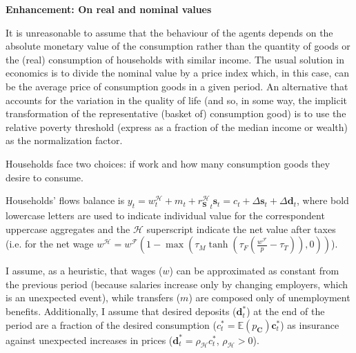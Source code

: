 \documentclass[a4paper, headings=standardclasses]{scrartcl}
\newenvironment{enh}[1][]{\begin{framed}\noindent\textbf{Enhancement: #1}\par}{\end{framed}}
\begin{document}
\begin{enh}[On real and nominal values]
    It is unreasonable to assume that the behaviour of the agents depends on the absolute monetary value of the consumption rather than the quantity of goods or the (real) consumption of households with similar income.
    The usual solution in economics is to divide the nominal value by a price index which, in this case, can be the average price of consumption goods in a given period.
    An alternative that accounts for the variation in the quality of life (and so, in some way, the implicit transformation of the representative (basket of) consumption good) is to use the relative poverty threshold (express as a fraction of the median income or wealth) as the normalization factor.
\end{enh}

Households face two choices: if work and how many consumption goods they desire to consume.

Households' flows balance is $y_t = w^{\mathcal{H}}_t + m_t + {r^{\mathcal{H}}_{\mathbf{S}}}_t \mathbf{s}_t = c_t + {\Delta \mathbf{s}}_t + {\Delta \mathbf{d}}_t$, where bold lowercase letters are used to indicate individual value for the correspondent uppercase aggregates and the $\mathcal{H}$ superscript indicate the net value after taxes (i.e. for the net wage $w^\mathcal{H} = w^{\mathcal{F}} (1 - \max(\tau_M \tanh(\tau_F(\frac{w^{\mathcal{F}}}{p}-\tau_T)),0))$).

I assume, as a heuristic, that wages ($w$) can be approximated as constant from the previous period (because salaries increase only by changing employers, which is an unexpected event), while transfers ($m$) are composed only of unemployment benefits.
Additionally, I assume that desired deposits ($\mathbf{d}^*_t$) at the end of the period are a fraction of the desired consumption ($c^*_t = \mathbb{E}(p_\mathbf{C}) \mathbf{c}^*_t$) as insurance against unexpected increases in prices ($\mathbf{d}^*_t = \rho_\mathcal{H}c^*_t$, $\rho_\mathcal{H} > 0$).
\end{document}
